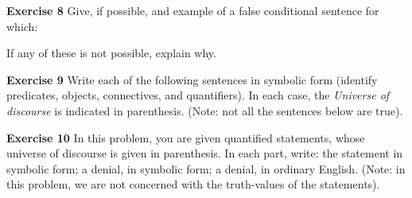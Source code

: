 \documentclass[12pt,oneside]{exam}
\newenvironment{exercise}[1]{\vspace{.1in}\noindent\textbf{Exercise #1 \hspace{.05em}}}{}
\begin{document}
\begin{exercise}{8}
Give, if possible, and example of a false conditional sentence for which:
If any of these is not possible, explain why. 
\end{exercise}

\begin{exercise}{9}
Write each of the following sentences in symbolic form (identify predicates, objects, connectives, and quantifiers). In each case, the \textit{Universe of discourse} is indicated in parenthesis. (Note: not all the sentences below are true).
\end{exercise}

\begin{exercise}{10} 
In this problem, you are given quantified statements, whose universe of discourse is given in parenthesis. In each part, write: the statement in symbolic form; a denial, in symbolic form; a denial, in ordinary English. (Note: in this problem, we are not concerned with the truth-values of the statements). 
\end{exercise}
\end{document}
